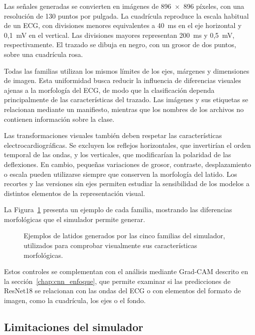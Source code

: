 Las señales generadas se convierten en imágenes de 896~×~896 píxeles, con una resolución de 130 puntos por pulgada. La cuadrícula reproduce la escala habitual de un ECG, con divisiones menores equivalentes a 40~ms en el eje horizontal y 0,1~mV en el vertical. Las divisiones mayores representan 200~ms y 0,5~mV, respectivamente. El trazado se dibuja en negro, con un grosor de dos puntos, sobre una cuadrícula rosa.

Todas las familias utilizan los mismos límites de los ejes, márgenes y dimensiones de imagen. Esta uniformidad busca reducir la influencia de diferencias visuales ajenas a la morfología del ECG, de modo que la clasificación dependa principalmente de las características del trazado. Las imágenes y sus etiquetas se relacionan mediante un manifiesto, mientras que los nombres de los archivos no contienen información sobre la clase.

Las transformaciones visuales también deben respetar las características electrocardiográficas. Se excluyen los reflejos horizontales, que invertirían el orden temporal de las ondas, y los verticales, que modificarían la polaridad de las deflexiones. En cambio, pequeñas variaciones de grosor, contraste, desplazamiento o escala pueden utilizarse siempre que conserven la morfología del latido. Los recortes y las versiones sin ejes permiten estudiar la sensibilidad de los modelos a distintos elementos de la representación visual.

La Figura~\ref{fig:synthetic_examples} presenta un ejemplo de cada familia, mostrando las diferencias morfológicas que el simulador permite generar.

\begin{figure}[H]
  \centering
  \caption{Ejemplos de latidos generados por las cinco familias del simulador, utilizados para comprobar visualmente sus características morfológicas.}
  \label{fig:synthetic_examples}
\end{figure}

Estos controles se complementan con el análisis mediante Grad-CAM descrito en la sección~\ref{chap:cnn_enfoque}, que permite examinar si las predicciones de ResNet18 se relacionan con las ondas del ECG o con elementos del formato de imagen, como la cuadrícula, los ejes o el fondo.

\subsection{Limitaciones del simulador}

